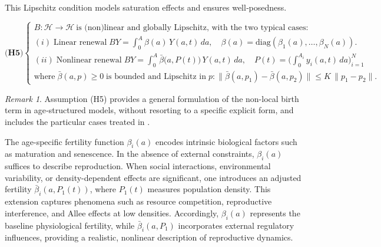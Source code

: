 \documentclass[10pt, a4paper]{amsart}
\theoremstyle{plain}
\theoremstyle{definition}
\theoremstyle{remark}
\newtheorem{remark}[lemma]{Remark}
\numberwithin{equation}{section}
\def\to{\rightarrow}
\begin{document}
This Lipschitz condition models saturation effects and ensures well‑posedness.

$$
\textbf{(H5)}\begin{cases}
B:\mathcal H\to \mathcal H\ \text{is (non)linear and globally Lipschitz, with the two typical cases:}
\\(i)\;  \text{Linear renewal}\; 
    BY=\int_0^A \beta(a)\,Y(a,t)\,da,
   \quad
   \beta(a)=\mathrm{diag}(\beta_1(a),\dots,\beta_N(a)).
\\(ii)\; \text{Nonlinear renewal}\;
     BY=\displaystyle\int_0^A \bar\beta\bigl(a,P(t)\bigr)\,Y(a,t)\,da,
   \quad
   P(t)=\Big(\!\!\int_0^{A_i}y_i(a,t)\,da\Big)_{i=1}^N
   \\\text{where}\; \bar\beta(a,p)\ge0 \;\text{is bounded and Lipschitz in}\; p:
   \|\bar\beta(a,p_1)-\bar\beta(a,p_2)\|\le K\,\|p_1-p_2\|.
\end{cases}
$$

\begin{remark}
Assumption (H5) provides a general formulation of the non-local birth term in age‑structured models, without resorting to a specific explicit form, and includes the particular cases treated in \cite{ref71,ref58,ref57, ref53}.
\end{remark}

The age-specific fertility function $\beta_i(a)$ encodes intrinsic biological factors such as maturation and senescence. In the absence of external constraints, $\beta_i(a)$ suffices to describe reproduction. When social interactions, environmental variability, or density-dependent effects are significant, one introduces an adjusted fertility $\bar\beta_i(a,P_1(t))$, where $P_1(t)$ measures population density. This extension captures phenomena such as resource competition, reproductive interference, and Allee effects at low densities. Accordingly, $\beta_i(a)$ represents the baseline physiological fertility, while $\bar\beta_i(a,P_1)$ incorporates external regulatory influences, providing a realistic, nonlinear description of reproductive dynamics.
\end{document}
